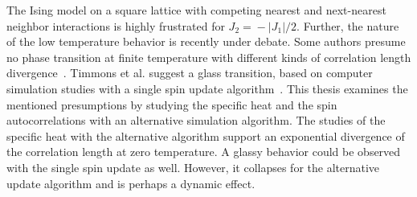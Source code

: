 
The Ising model on a square lattice with competing nearest and next-nearest neighbor interactions is highly frustrated for $J_2\!=\!-|J_1|/2$. Further,
the nature of the low temperature behavior is recently under debate. Some authors presume no phase transition at finite temperature 
with different kinds of correlation length divergence~\cite{Kalz2008,Lee2024}. Timmons et al. suggest a glass transition, based on 
computer simulation studies with a single spin update algorithm~\cite{Timmons2018}. This thesis examines the mentioned presumptions by 
studying the specific heat and the spin autocorrelations with an alternative simulation algorithm. The studies of the specific heat with the 
alternative algorithm support an exponential divergence of the correlation length at zero temperature.  A glassy behavior could be observed with 
the single spin update as well. However, it collapses for the alternative update algorithm and is perhaps a dynamic effect. 



